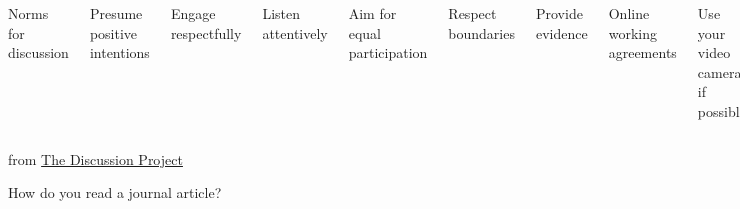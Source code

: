 \documentclass[aspectratio=169,12pt,t]{beamer}
\begin{document}
\begin{frame}{}

  \begin{columns}

      \centerline{\color{title} Norms for discussion}

      \bigskip

      {\footnotesize
      \bi
    \item Presume positive intentions
    \item Engage respectfully
    \item Listen attentively
    \item Aim for equal participation
    \item Respect boundaries
    \item Provide evidence
      \ei }



      \centerline{\color{title} Online working agreements}

      \bigskip

      \footnotesize

      \bi
    \item Use your video camera if possible
    \item Use names to address each other
    \item Use features (mute, raise hand, chat, etc) appropriately
    \item Be okay with silence
    \item Start and end on time
      \ei

  \end{columns}

\bigskip \bigskip \bigskip
\bigskip \bigskip \bigskip

\hfill {\scriptsize from \href{https://discussion.education.wisc.edu}{The Discussion Project}}

\end{frame}





\begin{frame}[c]{}

\centerline{\Large \color{title} How do you read a journal article?}

\end{frame}
\end{document}
